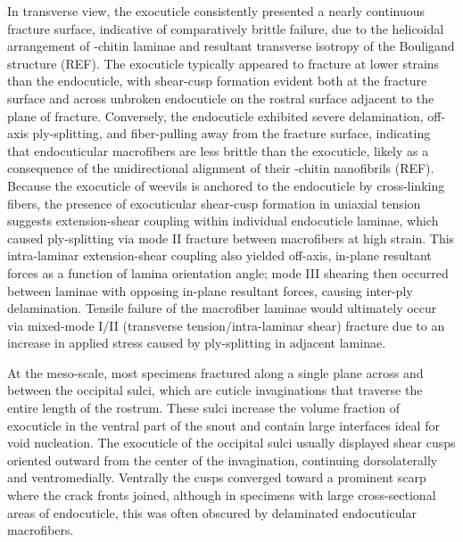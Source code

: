 \documentclass[twocolumn, linenumbers, superscriptaddress]{revtex4-1}
\begin{document}
		In transverse view, the exocuticle consistently presented a nearly continuous fracture surface, indicative of comparatively brittle failure, due to the helicoidal arrangement of \textalpha-chitin laminae and resultant transverse isotropy of the Bouligand structure (REF).
		The exocuticle typically appeared to fracture at lower strains than the endocuticle, with shear-cusp formation evident both at the fracture surface and across unbroken endocuticle on the rostral surface adjacent to the plane of fracture.
		Conversely, the endocuticle exhibited severe delamination, off-axis ply-splitting, and fiber-pulling away from the fracture surface, indicating that endocuticular macrofibers are less brittle than the exocuticle, likely as a consequence of the unidirectional alignment of their \textalpha-chitin nanofibrils (REF).
		Because the exocuticle of weevils is anchored to the endocuticle by cross-linking fibers, the presence of exocuticular shear-cusp formation in uniaxial tension suggests extension-shear coupling within individual endocuticle laminae, which caused ply-splitting via mode II fracture between macrofibers at high strain.
		This intra-laminar extension-shear coupling also yielded off-axis, in-plane resultant forces as a function of lamina orientation angle; mode III shearing then occurred between laminae with opposing in-plane resultant forces, causing inter-ply delamination.
		Tensile failure of the macrofiber laminae would ultimately occur via mixed-mode I/II (transverse tension/intra-laminar shear) fracture due to an increase in applied stress caused by ply-splitting in adjacent laminae.
		
		At the meso-scale, most specimens fractured along a single plane across and between the occipital sulci, which are cuticle invaginations that traverse the entire length of the rostrum.
		These sulci increase the volume fraction of exocuticle in the ventral part of the snout and contain large interfaces ideal for void nucleation.
		The exocuticle of the occipital sulci usually displayed shear cusps oriented outward from the center of the invagination, continuing dorsolaterally and ventromedially.
		Ventrally the cusps converged toward a prominent scarp where the crack fronts joined, although in specimens with large cross-sectional areas of endocuticle, this was often obscured by delaminated endocuticular macrofibers.
		
\end{document}
